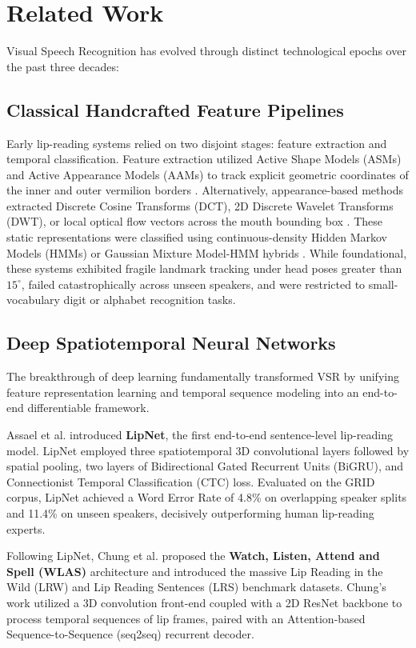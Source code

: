 \documentclass[conference,compsoc,10pt]{IEEEtran}
\begin{document}
\section{Related Work}

Visual Speech Recognition has evolved through distinct technological epochs over the past three decades:

\subsection{Classical Handcrafted Feature Pipelines}
Early lip-reading systems relied on two disjoint stages: feature extraction and temporal classification. Feature extraction utilized Active Shape Models (ASMs) and Active Appearance Models (AAMs) to track explicit geometric coordinates of the inner and outer vermilion borders \cite{matthews}. Alternatively, appearance-based methods extracted Discrete Cosine Transforms (DCT), 2D Discrete Wavelet Transforms (DWT), or local optical flow vectors across the mouth bounding box \cite{potamianos}. These static representations were classified using continuous-density Hidden Markov Models (HMMs) or Gaussian Mixture Model-HMM hybrids \cite{dupont}. While foundational, these systems exhibited fragile landmark tracking under head poses greater than $15^\circ$, failed catastrophically across unseen speakers, and were restricted to small-vocabulary digit or alphabet recognition tasks.

\subsection{Deep Spatiotemporal Neural Networks}
The breakthrough of deep learning fundamentally transformed VSR by unifying feature representation learning and temporal sequence modeling into an end-to-end differentiable framework. 

Assael et al. \cite{lipnet} introduced \textbf{LipNet}, the first end-to-end sentence-level lip-reading model. LipNet employed three spatiotemporal 3D convolutional layers followed by spatial pooling, two layers of Bidirectional Gated Recurrent Units (BiGRU), and Connectionist Temporal Classification (CTC) loss. Evaluated on the GRID corpus, LipNet achieved a Word Error Rate of 4.8\% on overlapping speaker splits and 11.4\% on unseen speakers, decisively outperforming human lip-reading experts. 

Following LipNet, Chung et al. \cite{wlas} proposed the \textbf{Watch, Listen, Attend and Spell (WLAS)} architecture and introduced the massive Lip Reading in the Wild (LRW) and Lip Reading Sentences (LRS) benchmark datasets. Chung's work utilized a 3D convolution front-end coupled with a 2D ResNet backbone to process temporal sequences of lip frames, paired with an Attention-based Sequence-to-Sequence (seq2seq) recurrent decoder. 
\end{document}
